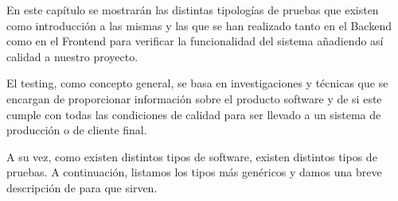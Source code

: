 En este capítulo se mostrarán las distintas tipologías de pruebas que existen como introducción a las mismas y las que se han realizado tanto en el Backend como en el Frontend para verificar la funcionalidad del sistema añadiendo así calidad a nuestro proyecto.

\newpage

El testing, como concepto general, se basa en investigaciones y técnicas que se encargan de proporcionar información sobre el producto software y de si este cumple con todas las condiciones de calidad para ser llevado a un sistema de producción o de cliente final.

A su vez, como existen distintos tipos de software, existen distintos tipos de pruebas. A continuación, listamos los tipos más genéricos y damos una breve descripción de para que sirven.

